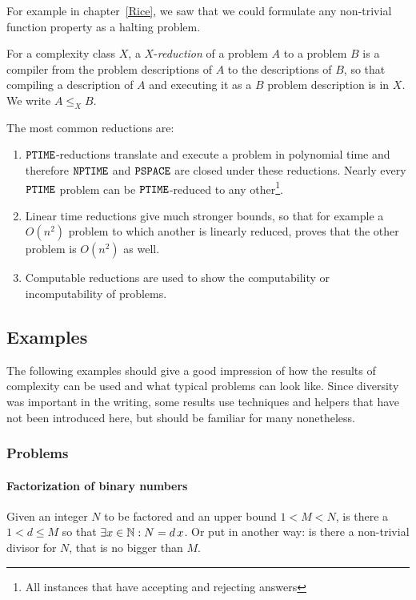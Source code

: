For example in chapter~\ref{Rice}, we saw that we could formulate any 
non-trivial function property as a halting problem.

\begin{defn}
	For a complexity class $X$, a $X$-\emph{reduction} of a problem $A$ to a
	problem $B$ is a compiler from the problem descriptions of $A$ to the 
	descriptions of $B$, so that compiling a description of $A$ and executing 
	it as a $B$ problem description is in $X$. We write $A\leq_X B$.
\end{defn}

\begin{example}
	The most common reductions are:
	\begin{enumerate}
		\item $\mathtt{PTIME}$-reductions translate and execute a problem in polynomial 
			time and therefore $\mathtt{NPTIME}$ and $\mathtt{PSPACE}$ are closed under these reductions. Nearly every $\mathtt{PTIME}$ problem can be $\mathtt{PTIME}$-reduced to any other\footnote{All instances that have accepting and rejecting answers}.
		\item Linear time reductions give much stronger bounds, so that for example
			a $O(n^2)$ problem to which another is linearly reduced, proves that the other 
			problem is $O(n^2)$ as well.
		\item Computable reductions are used to show the computability or 
			incomputability of problems.
	\end{enumerate}
\end{example}

\subsection{Examples}
The following examples should give a good impression of how the results of 
complexity can be used and what typical problems can look like. Since 
diversity was important in the writing, some results use techniques and 
helpers that have not been introduced here, but should be familiar for many nonetheless.
\subsubsection{Problems}
\paragraph{Factorization of binary numbers}
Given an integer $N$ to be factored and an upper bound $1<M<N$, is there a 
$1<d\leq M$ so that $\exists x\in \mathbb{N}: N = d\,x$. Or put in another way: is 
there a non-trivial divisor for $N$, that is no bigger than $M$.


